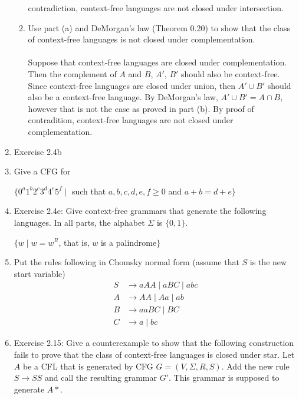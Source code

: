 \documentclass{article}
\begin{document}
\begin{enumerate}
\begin{enumerate}[label =\alph*.]
                contradiction, context-free languages are not closed under intersection.
                \item Use part (a) and DeMorgan's law (Theorem 0.20) to show that the class of context-free languages is not closed under complementation.\\\\
                Suppose that context-free languages are closed under complementation. Then the complement of $A$ and $B$, $A'$, $B'$ should also be context-free.
                Since context-free languages are closed under union, then $A'\cup B'$ should also be a context-free language. By DeMorgan's law, $A'\cup B' = A\cap B$, 
                however that is not the case as proved in part (b). By proof of contradition, context-free languages are not closed under complementation.  
            \end{enumerate}
        \item Exercise 2.4b

        \item Give a CFG for
            \begin{center}
                $\{0^a1^b2^c3^d4^e5^f \mid $ such that $ a,b,c,d,e,f\geq 0 $ and $ a+b=d+e \}$
            \end{center}
        
        \item Exercise 2.4e: Give context-free grammars that generate the following languages. In all parts, the alphabet $\Sigma$ is $\{0,1\}$.
            \begin{center}
                $\{w\mid w=w^R$, that is, $w$ is a palindrome$\}$
            \end{center}
                
        \item Put the rules following in Chomsky normal form (assume that $S$ is the new start variable)
            \begin{align*}
                S&\rightarrow aAA \mid aBC \mid abc\\
                A&\rightarrow AA \mid Aa \mid ab\\
                B&\rightarrow aaBC \mid BC\\
                C&\rightarrow a\mid bc
            \end{align*}
        
        \item Exercise 2.15: Give a counterexample to show that the following construction fails to prove that the class of context-free languages
            is closed under star. Let $A$ be a CFL that is generated by CFG $G=(V,\Sigma, R,S)$. Add the new rule $S\rightarrow SS$ and call the 
            resulting grammar $G'$. This grammar is supposed to generate $A*$.


\end{enumerate}
\end{document}
